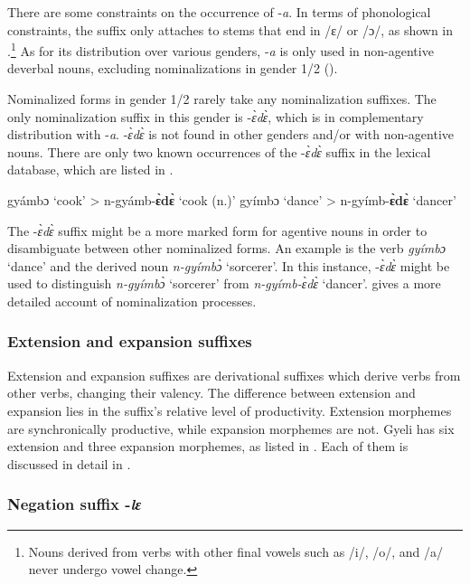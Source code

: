 There are some constraints on the occurrence of -{\itshape a}. In terms of phonological constraints, the suffix only attaches to stems that end in /ɛ/ or /ɔ/, as shown in .\footnote{Nouns derived from verbs with other final vowels such as /i/, /o/, and /a/ never undergo vowel change.} As for its distribution over various genders, -{\itshape a} is only used in non-agentive deverbal nouns, excluding nominalizations in gender 1/2 (). 


Nominalized forms in gender 1/2 rarely take any nominalization suffixes. The only nominalization suffix in this gender is -{\itshape ɛ̀dɛ̀}, which is in complementary distribution with -{\itshape a}. -{\itshape ɛ̀dɛ̀} is not found in other genders and/or with non-agentive nouns. 
There are only two known occurrences of the -{\itshape ɛ̀dɛ̀} suffix in the lexical database, which are listed in .

\ea  \label{NOMede}
\ea  gyámbɔ `cook' >  n-gyámb-{\bfseries ɛ̀dɛ̀} `cook (n.)'
\ex gyímbɔ `dance' >  n-gyímb-{\bfseries ɛ̀dɛ̀} `dancer'
\z
\z

The -{\itshape ɛ̀dɛ̀} suffix might be a more marked form for agentive nouns in order to disambiguate between other nominalized forms. An example is the verb {\itshape gyímbɔ} `dance'  and the derived noun {\itshape n-gyímbɔ̀} `sorcerer'. In this instance, -{\itshape ɛ̀dɛ̀} might be used to distinguish   {\itshape n-gyímbɔ̀} `sorcerer' from {\itshape n-gyímb-ɛ̀dɛ̀} `dancer'.
 gives a more detailed account of nominalization processes.









\subsubsection{Extension and expansion suffixes}
\label{sec:EXtp}

Extension and expansion suffixes are derivational suffixes which derive verbs from other verbs, changing their valency. The difference between extension and expansion lies in the suffix's relative level of productivity. Extension morphemes are synchronically productive, while expansion morphemes are not. Gyeli has six extension and three expansion morphemes, as listed in . Each of them is discussed in detail in .

\subsubsection{Negation suffix -{\itshape lɛ}}
\label{sec:NEGSuff}

